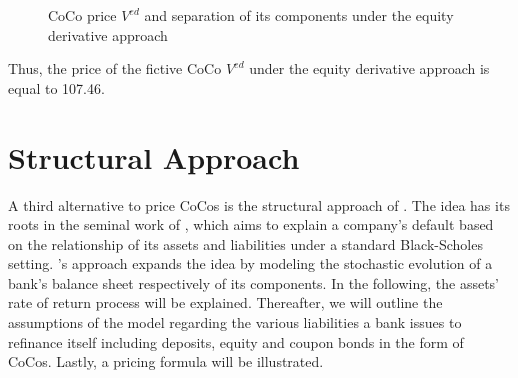 \begin{figure}[H]
\centering
{}
\caption[CoCo price pursuant to the equity derivative approach and separation of its components]{CoCo price $V^{ed}$ and separation of its components under the equity derivative approach}
\label{pricecomponents}
\end{figure}

Thus, the price of the fictive CoCo $V^{ed}$ under the equity derivative approach is equal to 107.46. 

\section{Structural Approach} \label{sec:structuralapproach}
A third alternative to price CoCos is the structural approach of \citet{pennacchi2010structural}. The idea has its roots in the seminal work of \citet{merton1974pricing}, which aims to explain a company's default based on the relationship of its assets and liabilities under a standard Black-Scholes setting. \citet{pennacchi2010structural}'s approach expands the idea by modeling the stochastic evolution of a bank's balance sheet respectively of its components. In the following, the assets' rate of return process will be explained. Thereafter, we will outline the assumptions of the model regarding the various liabilities a bank issues to refinance itself including deposits, equity and coupon bonds in the form of CoCos. Lastly, a pricing formula will be illustrated.


